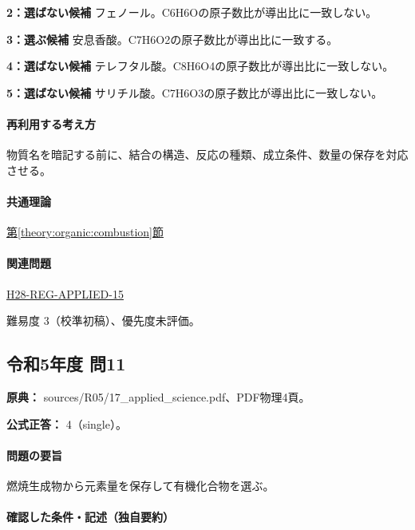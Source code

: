 \noindent\textbf{2：選ばない候補} フェノール。C6H6Oの原子数比が導出比に一致しない。\par

\noindent\textbf{3：選ぶ候補} 安息香酸。C7H6O2の原子数比が導出比に一致する。\par

\noindent\textbf{4：選ばない候補} テレフタル酸。C8H6O4の原子数比が導出比に一致しない。\par

\noindent\textbf{5：選ばない候補} サリチル酸。C7H6O3の原子数比が導出比に一致しない。\par

\paragraph{再利用する考え方} 物質名を暗記する前に、結合の構造、反応の種類、成立条件、数量の保存を対応させる。

\paragraph{共通理論} \hyperref[theory:organic:combustion]{第\ref*{theory:organic:combustion}節}

\paragraph{関連問題} \hyperref[q:h28-reg-applied-15]{H28-REG-APPLIED-15}

\par 難易度 3（校準初稿）、優先度未評価。

\subsection{令和5年度 問11}
\label{q:r05-reg-applied-11}

\noindent\textbf{原典：} sources/R05/17\_applied\_science.pdf、PDF物理4頁。

\textbf{公式正答：} 4（single）。

\paragraph{問題の要旨} 燃焼生成物から元素量を保存して有機化合物を選ぶ。

\paragraph{確認した条件・記述（独自要約）}\mbox{}\par

